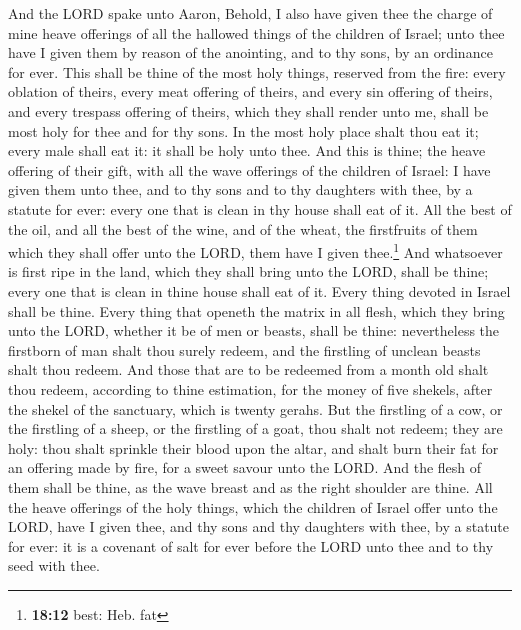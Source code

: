  And the LORD spake unto Aaron, Behold, I also have given
thee the charge of mine heave offerings of all the hallowed things of
the children of Israel; unto thee have I given them by reason of the
anointing, and to thy sons, by an ordinance for ever. 
This shall be thine of the most holy things, reserved from the fire:
every oblation of theirs, every meat offering of theirs, and every sin
offering of theirs, and every trespass offering of theirs, which they
shall render unto me, shall be most holy for thee and for thy sons.
 In the most holy place shalt thou eat it; every male
shall eat it: it shall be holy unto thee.  And this is
thine; the heave offering of their gift, with all the wave offerings of
the children of Israel: I have given them unto thee, and to thy sons and
to thy daughters with thee, by a statute for ever: every one that is
clean in thy house shall eat of it.  All the best of the
oil, and all the best of the wine, and of the wheat, the firstfruits of
them which they shall offer unto the LORD, them have I given
thee.\footnote{\textbf{18:12} best: Heb. fat}  And
whatsoever is first ripe in the land, which they shall bring unto the
LORD, shall be thine; every one that is clean in thine house shall eat
of it.  Every thing devoted in Israel shall be thine.
 Every thing that openeth the matrix in all flesh, which
they bring unto the LORD, whether it be of men or beasts, shall be
thine: nevertheless the firstborn of man shalt thou surely redeem, and
the firstling of unclean beasts shalt thou redeem.  And
those that are to be redeemed from a month old shalt thou redeem,
according to thine estimation, for the money of five shekels, after the
shekel of the sanctuary, which is twenty gerahs.  But the
firstling of a cow, or the firstling of a sheep, or the firstling of a
goat, thou shalt not redeem; they are holy: thou shalt sprinkle their
blood upon the altar, and shalt burn their fat for an offering made by
fire, for a sweet savour unto the LORD.  And the flesh of
them shall be thine, as the wave breast and as the right shoulder are
thine.  All the heave offerings of the holy things, which
the children of Israel offer unto the LORD, have I given thee, and thy
sons and thy daughters with thee, by a statute for ever: it is a
covenant of salt for ever before the LORD unto thee and to thy seed with
thee.

